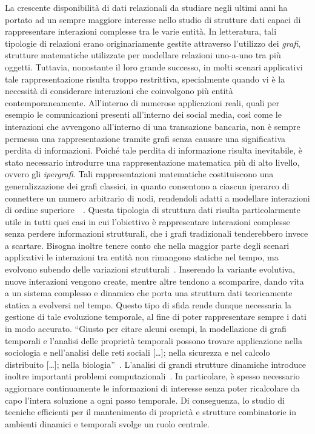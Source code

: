 
La crescente disponibilità di dati relazionali da studiare negli ultimi anni ha portato ad un sempre maggiore interesse nello studio di strutture dati capaci di rappresentare interazioni complesse tra le varie entità.
In letteratura, tali tipologie di relazioni erano originariamente gestite attraverso l'utilizzo dei \emph{grafi}, strutture matematiche utilizzate per modellare relazioni uno-a-uno tra più oggetti.
Tuttavia, nonostante il loro grande successo, in molti scenari applicativi tale rappresentazione risulta troppo restrittiva, specialmente quando vi è la necessità di considerare interazioni che coinvolgono più entità contemporaneamente.
All'interno di numerose applicazioni reali, quali per esempio le comunicazioni presenti all'interno dei social media, così come le interazioni che avvengono all'interno di una transazione bancaria, non è sempre permessa una rappresentazione tramite grafi senza causare una significativa perdita di informazioni.
Poiché tale perdita di informazione risulta inevitabile, è stato necessario introdurre una rappresentazione matematica più di alto livello, ovvero gli \emph{ipergrafi}.
Tali rappresentazioni matematiche costituiscono una generalizzazione dei grafi classici, in quanto consentono a ciascun iperarco di connettere un numero arbitrario di nodi, rendendoli adatti a modellare interazioni di ordine superiore~\cite{antelmi2023}~\cite{bretto2013}.
Questa tipologia di struttura dati risulta particolarmente utile in tutti quei casi in cui l'obiettivo è rappresentare interazioni complesse senza perdere informazioni strutturali, che i grafi tradizionali tenderebbero invece a scartare.
Bisogna inoltre tenere conto che nella maggior parte degli scenari applicativi le interazioni tra entità non rimangono statiche nel tempo, ma evolvono subendo delle variazioni strutturali~\cite{holme2012}.
Inserendo la variante evolutiva, nuove interazioni vengono create, mentre altre tendono a scomparire, dando vita a un sistema complesso e dinamico che porta una struttura dati teoricamente statica a evolversi nel tempo.
Questo tipo di sfida rende dunque necessaria la gestione di tale evoluzione temporale, al fine di poter rappresentare sempre i dati in modo accurato.
``Giusto per citare alcuni esempi, la modellazione di grafi temporali e l'analisi delle proprietà temporali possono trovare applicazione nella sociologia e nell'analisi delle reti sociali [\ldots]; nella sicurezza e nel calcolo distribuito [\ldots]; nella biologia''~\cite{lotito2020}.
L'analisi di grandi strutture dinamiche introduce inoltre importanti problemi computazionali~\cite{lotito2020}.
In particolare, è spesso necessario aggiornare continuamente le informazioni di interesse senza poter ricalcolare da capo l'intera soluzione a ogni passo temporale.
Di conseguenza, lo studio di tecniche efficienti per il mantenimento di proprietà e strutture combinatorie in ambienti dinamici e temporali svolge un ruolo centrale.